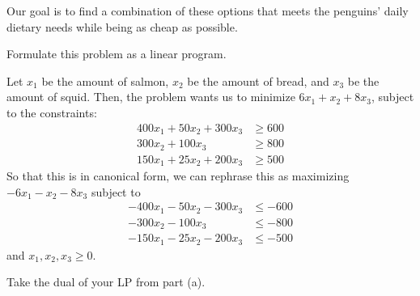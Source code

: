\documentclass[11pt]{article}
\begin{document}
\noindent Our goal is to find a combination of these options that meets the penguins' daily dietary needs while being as cheap as possible.

\begin{subparts}
\subpart Formulate this problem as a linear program. 

\begin{solution}
	Let \(x_1\) be the amount of salmon, \(x_2\) be the amount of bread, and \(x_3\) be the amount of squid. 
	Then, the problem wants us to minimize \(6x_1 + x_2 + 8x_3\), subject to the constraints:
	\begin{align*}
		400x_1 + 50x_2 + 300x_3 &\ge  600\\
		300x_2 + 100x_3 &\ge 800\\
		150x_1 + 25x_2 + 200x_3 &\ge 500
	\end{align*}
	So that this is in canonical form, we can rephrase this as maximizing \(-6x_1 - x_2 - 8x_3\) 
	subject to 
	\begin{align*}
		-400x_1 - 50x_2 - 300x_3 &\le -600\\
		-300x_2 - 100 x_3 &\le  -800\\
		-150x_1 - 25x_2 - 200x_3 & \le  -500
	\end{align*}
	and \(x_1, x_2, x_3 \ge  0\).
\end{solution}
\subpart Take the dual of your LP from part (a).


\end{subparts}
\end{document}
